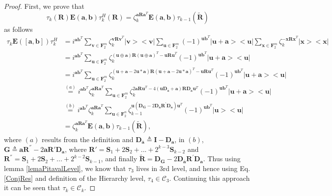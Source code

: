\documentclass[lettersize,journal,onecolumn]{IEEEtran}
\begin{document}
\begin{proof}
	First, we prove that 
	\begin{equation}\label{ConjRes}
		\tau_k\left(\mathbf{R}\right)\mathbf{E}\left(\mathbf{a, b} \right)\tau_k^H\left(\mathbf{R}\right) = \zeta_k^{\mathbf{aRa}^T}\mathbf{E}\left(\mathbf{a, b}\right) \tau_{k-1}\left(\widetilde{\mathbf{R}} \right)
	\end{equation}
 as follows
\begin{align}
	\tau_k  \mathbf{E}\left( \left[\mathbf{a, b}\right]\right) \tau_k^H& = i^{\mathbf{ab}^T} \sum_{\mathbf{v}\in \mathbf{F}_2^m}{\zeta_k^{\mathbf{v R v}^T} |\mathbf{v}><\mathbf{v}|}\sum_{\mathbf{u}\in \mathbf{F}_2^m}{(-1)^{\mathbf{u b}^T} |\mathbf{u+a}><\mathbf{u}|}\sum_{\mathbf{x}\in \mathbf{F}_2^m}{\zeta_k^{-\mathbf{x R x}^T} |\mathbf{x}><\mathbf{x}|} \nonumber \\
	&= i^{\mathbf{ab}^T} \sum_{\mathbf{u}\in \mathbf{F}_2^m}{ \zeta_k^{\left(\mathbf{u\oplus a}\right)\mathbf{R}\left(\mathbf{u \oplus a}\right)^T-\mathbf{u R u}^T } (-1)^{\mathbf{u b}^T} |\mathbf{u+a}><\mathbf{u}|} \nonumber\\
	&= i^{\mathbf{ab}^T} \sum_{\mathbf{u}\in \mathbf{F}_2^m}{ \zeta_k^{\left(\mathbf{u + a}-2\mathbf{u}*\mathbf{a} \right)\mathbf{R}\left(\mathbf{u + a}-2\mathbf{u}*\mathbf{a}\right)^T-\mathbf{u R u}^T } (-1)^{\mathbf{u b}^T} |\mathbf{u+a}><\mathbf{u}|} \nonumber \\
	&\stackrel{(a)}{=} i^{\mathbf{ab}^T }\zeta_k^{\mathbf{aRa}^T} \sum_{\mathbf{u}\in \mathbf{F}_2^m}{ \zeta_k^{2\mathbf{aRu}^T-4\left( \mathbf{u\mathbf{D}_{\overline{\mathbf{a}}}+a}\right)\mathbf{R}\mathbf{D}_{\mathbf{a}} \mathbf{u}^T } (-1)^{\mathbf{u b}^T} |\mathbf{u+a}><\mathbf{u}|} \nonumber \\
	&\stackrel{(b)}{=} i^{\mathbf{ab}^T } \zeta_k^{\mathbf{aRa}^T} \sum_{\mathbf{u}\in \mathbf{F}_2^n}{ \zeta_{k-1}^{\mathbf{u}\left(\mathbf{D}_{\mathbf{G}}-2 \mathbf{D}_{\overline{\mathbf{a}}} \mathbf{R}^{'}\mathbf{D}_{\mathbf{a}}  \right) \mathbf{u}^T } (-1)^{\mathbf{u b}^T} |\mathbf{u}><\mathbf{u}|} \nonumber \\
	&= \zeta_k^{\mathbf{aRa}^T}\mathbf{E}\left(\mathbf{a, b}\right) \tau_{k-1}\left(\widetilde{\mathbf{R}} \right),
\end{align}
where $(a)$ results from the definition and $\mathbf{D}_{\overline{\mathbf{a}}} \triangleq \mathbf{I}-\mathbf{D}_{\mathbf{a}}$, in $(b)$, $\mathbf{G}\triangleq \mathbf{a}\mathbf{R}^{''}-2\mathbf{a}\mathbf{R}' \mathbf{D}_{\mathbf{a}}$, where $\mathbf{R}' = \mathbf{S}_1+2\mathbf{S}_2+...+2^{k-3}\mathbf{S}_{k-2}$ and $\mathbf{R}^{''}=\mathbf{S}_1+2\mathbf{S}_2+...+2^{k-2}\mathbf{S}_{k-1}$, and finally $\widetilde{\mathbf{R}} = \mathbf{D}_{\mathbf{G}}-2\mathbf{D}_{\overline{\mathbf{a}}} \mathbf{R}^{'}\mathbf{D}_{\mathbf{a}}$. Thus using lemma \ref{lemaPitavalLevel}, we know that $\tau_3$ lives in 3rd level, and  hence using Eq. \eqref{ConjRes} and definition of the Hierarchy level, $\tau_4 \in \mathcal{C}_3$. Continuing this approach it can be seen that $\tau_{k}\in \mathcal{C}_k$.


\end{proof}
\end{document}
